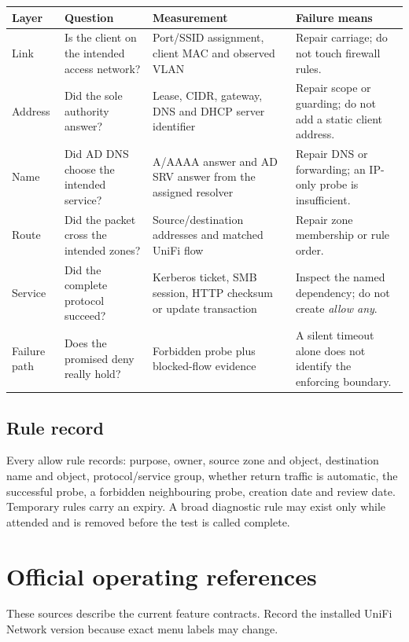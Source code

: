 \begin{tabularx}{\linewidth}{@{}p{.18\linewidth}p{.24\linewidth}p{.24\linewidth}L@{}}
\toprule
\textbf{Layer} & \textbf{Question} & \textbf{Measurement} & \textbf{Failure means}\\
\midrule
Link & Is the client on the intended access network? & Port/SSID assignment, client MAC and observed VLAN & Repair carriage; do not touch firewall rules.\\
Address & Did the sole authority answer? & Lease, CIDR, gateway, DNS and DHCP server identifier & Repair scope or guarding; do not add a static client address.\\
Name & Did AD DNS choose the intended service? & A/AAAA answer and AD SRV answer from the assigned resolver & Repair DNS or forwarding; an IP-only probe is insufficient.\\
Route & Did the packet cross the intended zones? & Source/destination addresses and matched UniFi flow & Repair zone membership or rule order.\\
Service & Did the complete protocol succeed? & Kerberos ticket, SMB session, HTTP checksum or update transaction & Inspect the named dependency; do not create \emph{allow any}.\\
Failure path & Does the promised deny really hold? & Forbidden probe plus blocked-flow evidence & A silent timeout alone does not identify the enforcing boundary.\\
\bottomrule
\end{tabularx}

\subsection*{Rule record}
Every allow rule records: purpose, owner, source zone and object, destination
name and object, protocol/service group, whether return traffic is automatic,
the successful probe, a forbidden neighbouring probe, creation date and review
date.  Temporary rules carry an expiry.  A broad diagnostic rule may exist only
while attended and is removed before the test is called complete.

\section{Official operating references}
These sources describe the current feature contracts.  Record the installed
UniFi Network version because exact menu labels may change.


